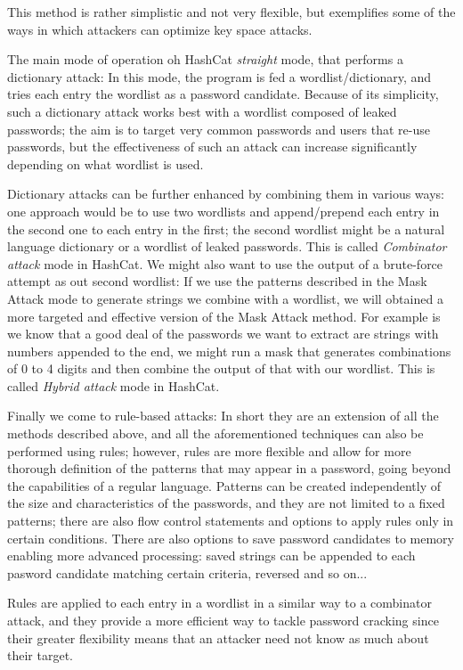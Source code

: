 This method is rather simplistic and not very flexible, but exemplifies some of the ways in which attackers can optimize key space attacks.\newline

The main mode of operation oh HashCat \emph{straight} mode, that performs a dictionary attack: In this mode, the program is fed a wordlist/dictionary, and tries each entry the wordlist as a password candidate. Because of its simplicity, such a dictionary attack works best with a wordlist composed of leaked passwords; the aim is to target very common passwords and users that re-use passwords, but the effectiveness of such an attack can increase significantly depending on what wordlist is used.

Dictionary attacks can be further enhanced by combining them in various ways: one approach would be to use two wordlists and append/prepend each entry in the second one to each entry in the first; 
the second wordlist might be a natural language dictionary or a wordlist of leaked passwords. This is called \emph{Combinator attack} mode in HashCat. 
We might also want to use the output of a brute-force attempt as out second wordlist: If we use the patterns described in the Mask Attack mode to generate strings we combine with a wordlist, we will obtained a more targeted and effective version of the Mask Attack method. 
For example is we know that a good deal of the passwords we want to extract are strings with numbers appended to the end, we might run a mask that generates combinations of 0 to 4 digits and then combine the output of that with our wordlist. This is called \emph{Hybrid attack } mode in HashCat.\newline

Finally we come to rule-based attacks: In short they are an extension of all the methods described above, and all the aforementioned techniques can also be performed using rules; however, rules are more flexible and allow for more thorough definition of the patterns that may appear in a password, going beyond the capabilities of a regular language.
Patterns can be created independently of the size and characteristics of the passwords, and they are not limited to a fixed patterns; there are also flow control statements and options to apply rules only in certain conditions.
There are also options to save password candidates to memory enabling more advanced processing: saved strings can be appended to each pasword candidate matching certain criteria, reversed and so on...

Rules are applied to each entry in a wordlist in a similar way to a combinator attack, and they provide a more efficient way to tackle password cracking since their greater flexibility means that an attacker need not know as much about their target. 
 
